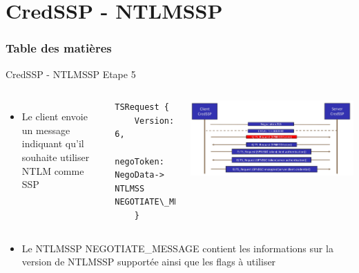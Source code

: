 \documentclass{beamer}
\begin{document}
\section{CredSSP - NTLMSSP}

\begin{frame}
	\frametitle{Table des matières}
	\tableofcontents[currentsection]
\end{frame}

\begin{frame}[fragile]{CredSSP - NTLMSSP Etape 5}
	 \begin{columns}[T]
	 	\begin{itemize}
	 	\item Le client envoie un message indiquant qu'il souhaite utiliser NTLM comme SSP
	 	\end{itemize}
	 \begin{lstlisting}[frame=single,basicstyle=\tiny]
TSRequest {
	Version:     6,
	negoToken:   NegoData-> NTLMSS NEGOTIATE\_MESSAGE
	}
	\end{lstlisting}
	 \includegraphics[scale=0.07]{step5.jpg}
	 \end{columns}
	 
	 \begin{itemize}
	 	\item Le NTLMSSP NEGOTIATE\_MESSAGE contient les informations sur la version de NTLMSSP supportée ainsi que les flags à utiliser
	 	\end{itemize}
\end{frame}
\end{document}
